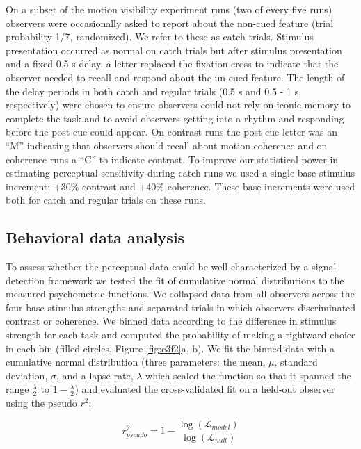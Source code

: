 On a subset of the motion visibility experiment runs (two of every five runs) observers were occasionally asked to report about the non-cued feature (trial probability 1/7, randomized). We refer to these as catch trials. Stimulus presentation occurred as normal on catch trials but after stimulus presentation and a fixed 0.5 s delay, a letter replaced the fixation cross to indicate that the observer needed to recall and respond about the un-cued feature. The length of the delay periods in both catch and regular trials (0.5 s and 0.5 - 1 s, respectively) were chosen to ensure observers could not rely on iconic memory to complete the task \citep{Sperling1960-oe} and to avoid observers getting into a rhythm and responding before the post-cue could appear. On contrast runs the post-cue letter was an “M” indicating that observers should recall about motion coherence and on coherence runs a “C” to indicate contrast. To improve our statistical power in estimating perceptual sensitivity during catch runs we used a single base stimulus increment: +30\% contrast and +40\% coherence. These base increments were used both for catch and regular trials on these runs.

\subsection{Behavioral data analysis}

To assess whether the perceptual data could be well characterized by a signal detection framework we tested the fit of cumulative normal distributions to the measured psychometric functions. We collapsed data from all observers across the four base stimulus strengths and separated trials in which observers discriminated contrast or coherence. We binned data according to the difference in stimulus strength for each task and computed the probability of making a rightward choice in each bin (filled circles, Figure \ref{fig:c3f2}a, b). We fit the binned data with a cumulative normal distribution (three parameters: the mean, $\mu$, standard deviation, $\sigma$, and a lapse rate, $\lambda$ which scaled the function so that it spanned the range $\frac{\lambda}{2}$ to $1-\frac{\lambda}{2}$) and evaluated the cross-validated fit on a held-out observer using the pseudo $r^2$:

\begin{equation}
    r_{pseudo}^2=1 - \frac{\log(\mathcal{L}_{model})}{\log(\mathcal{L}_{null})}
\end{equation}


